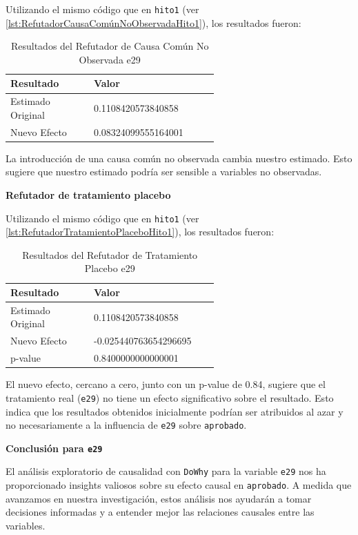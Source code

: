 Utilizando el mismo código que en \texttt{hito1} (ver \ref{lst:RefutadorCausaComúnNoObservadaHito1}), los resultados fueron:

\begin{table}[H]
    \centering
    \begin{tabular}{lp{0.6\linewidth}}
        \toprule
        \textbf{Resultado} & \textbf{Valor} \\
        \midrule
        Estimado Original & 0.1108420573840858 \\
        Nuevo Efecto & 0.08324099555164001 \\
        \bottomrule
    \end{tabular}
    \caption{Resultados del Refutador de Causa Común No Observada e29}
    \label{tab:refutador_causa_no_observada_e29}
\end{table}

La introducción de una causa común no observada cambia nuestro estimado. Esto sugiere que nuestro estimado podría ser sensible a variables no observadas.

\textbf{Refutador de tratamiento placebo}

Utilizando el mismo código que en \texttt{hito1} (ver \ref{lst:RefutadorTratamientoPlaceboHito1}), los resultados fueron:

\begin{table}[H]
    \centering
    \begin{tabular}{lp{0.6\linewidth}}
        \toprule
        \textbf{Resultado} & \textbf{Valor} \\
        \midrule
        Estimado Original & 0.1108420573840858 \\
        Nuevo Efecto & -0.025440763654296695 \\
        p-value & 0.8400000000000001 \\
        \bottomrule
    \end{tabular}
    \caption{Resultados del Refutador de Tratamiento Placebo e29}
    \label{tab:refutador_placebo_29}
\end{table}

El nuevo efecto, cercano a cero, junto con un p-value de 0.84, sugiere que el tratamiento real (\texttt{e29}) no tiene un efecto significativo sobre el resultado. Esto indica que los resultados obtenidos inicialmente podrían ser atribuidos al azar y no necesariamente a la influencia de \texttt{e29} sobre \texttt{aprobado}.

\textbf{Conclusión para \texttt{e29}}

El análisis exploratorio de causalidad con \texttt{DoWhy} para la variable \texttt{e29} nos ha proporcionado insights valiosos sobre su efecto causal en \texttt{aprobado}. A medida que avanzamos en nuestra investigación, estos análisis nos ayudarán a tomar decisiones informadas y a entender mejor las relaciones causales entre las variables.

